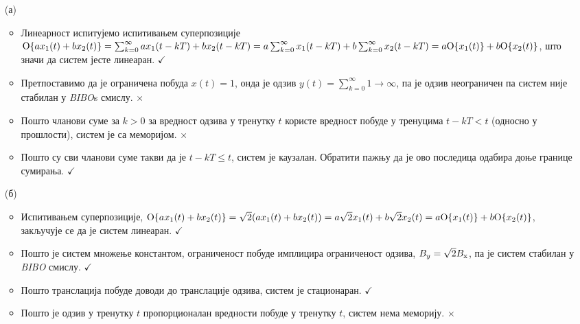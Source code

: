 \begin{enumerate}
    \item[(а)] 
    \begin{itemize}
    \item Линеарност испитујемо испитивањем суперпозиције
    ${\rm O}\{ a x_1(t) + b x_2(t) \} = \sum_{k = 0}^{\infty} ax_1(t-kT) + bx_2(t-kT) = 
    a \sum_{k = 0}^{\infty} x_1(t-kT) + b  \sum_{k = 0}^{\infty} x_2(t-kT) = a {\rm O}\{x_1(t)\} + b {\rm O}\{x_2(t)\}$,
    што значи да систем јесте линеаран.  \hfill $\checkmark$

    \item Претпоставимо да је ограничена побуда $x(t) = 1$, онда је одзив $y(t) = \sum_{k = 0}^{\infty} 1 \to \infty$, 
    па је одзив неограничен па систем није стабилан у \textit{BIBO}s смислу. \hfill $\times$

    \item Пошто чланови суме за $k > 0$ за вредност одзива у тренутку $t$ користе вредност побуде у тренуцима $t - kT < t$
    (односно у прошлости), систем је са меморијом. \hfill $\times$
    
    \item Пошто су сви чланови суме такви да је $t - kT \leq t$, систем је каузалан. Обратити пажњу да је ово 
    последица одабира доње границе сумирања.  \hfill $\checkmark$
    \end{itemize}

    \item[(б)]
    \begin{itemize}
        \item Испитивањем суперпозиције, ${\rm O}\{ a x_1(t) + b x_2(t) \} = \sqrt2 (ax_1(t) + bx_2(t)) = 
        a \sqrt 2 x_1(t) + b \sqrt 2 x_2(t)
        = a {\rm O}\{x_1(t)\} + b {\rm O}\{x_2(t)\}$, закључује се да је систем линеаран. \hfill $\checkmark$

        \item Пошто је систем множење константом, ограниченост побуде имплицира ограниченост одзива,
        $B_{y} = \sqrt 2 B_{\rm x}$, па је систем стабилан у \textit{BIBO} смислу. \hfill $\checkmark$

        \item Пошто транслација побуде доводи до транслације одзива, систем је стационаран. \hfill $\checkmark$

        \item Пошто је одзив у тренутку $t$ пропорционалан вредности побуде у тренутку $t$, систем нема меморију. \hfill $\times$
        

\end{itemize}
\end{enumerate}
